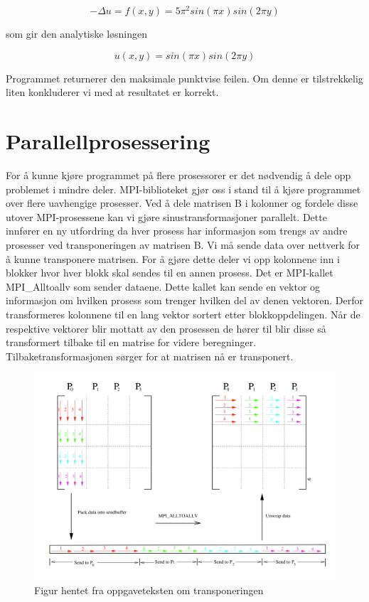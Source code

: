\documentclass[11pt,norsk,a4paper]{article}
\begin{document}
$$ -\Delta u = f(x,y) = 5\pi^2sin(\pi x)sin(2\pi y) $$

som gir den analytiske løsningen

$$ u(x,y) = sin(\pi x)sin(2\pi y) $$

Programmet returnerer den maksimale punktvise feilen. Om denne er tilstrekkelig liten konkluderer vi med at resultatet er korrekt. 

\section{Parallellprosessering}

For å kunne kjøre programmet på flere prosessorer er det nødvendig å dele opp problemet i mindre deler. MPI-biblioteket\cite{MPI} gjør oss i stand til å kjøre programmet over flere uavhengige prosesser. Ved å dele matrisen B i kolonner og fordele disse utover MPI-prosessene kan vi gjøre sinustransformasjoner parallelt. Dette innfører en ny utfordring da hver prosess har informasjon som trengs av andre prosesser ved transponeringen av matrisen B. Vi må sende data over nettverk for å kunne transponere matrisen. For å gjøre dette deler vi opp kolonnene inn i blokker hvor hver blokk skal sendes til en annen prosess. Det er MPI-kallet MPI\_Alltoallv som sender dataene. Dette kallet kan sende en vektor og informasjon om hvilken prosess som trenger hvilken del av denen vektoren. Derfor transformeres kolonnene til en lang vektor sortert etter blokkoppdelingen. Når de respektive vektorer blir mottatt av den prosessen de hører til blir disse så transformert tilbake til en matrise for videre beregninger. Tilbaketransformasjonen sørger for at matrisen nå er transponert.

\begin{figure}[h]
\centering
\includegraphics[scale=0.3]{transpose.png}
\caption{Figur hentet fra oppgaveteksten om transponeringen}
\end{figure}
\end{document}
